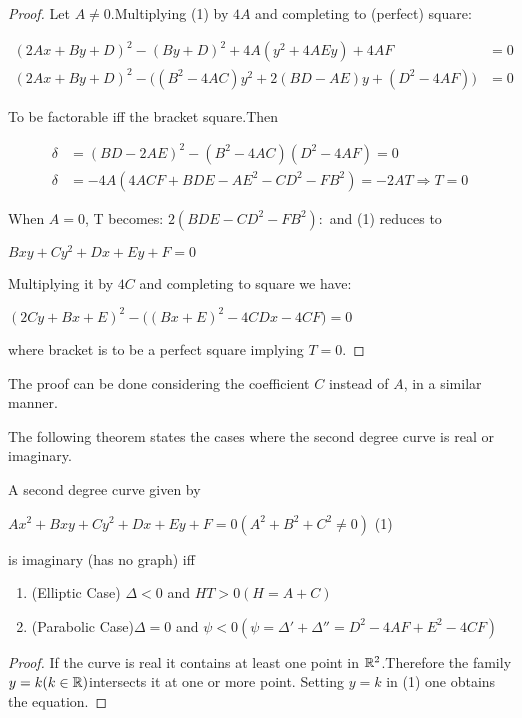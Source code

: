 \documentclass[11pt]{amsbook}
\begin{document}

	\begin{proof}
		Let $A\neq0$.Multiplying (1) by $4A$ and completing to (perfect) square:
		
		\begin{align*}
			(2Ax+By+D)^2-(By+D)^2+4A(y^2+4AEy)+4AF&=0\\
			(2Ax+By+D)^2-\Big((B^2-4AC)y^2+2(BD-AE)y+(D^2-4AF)\Big)&=0
		\end{align*}

		To be factorable iff the bracket square.Then

		\begin{align*}
		\delta &= (BD-2AE)^2-(B^2-4AC)(D^2-4AF)=0\\
		\delta &=-4A(4ACF+BDE-AE^2-CD^2-FB^2)=-2AT\Rightarrow T=0
		\end{align*}
		
		When $A=0$, T becomes: $2(BDE-CD^2-FB^2):$ and (1) reduces to

		\begin{center}
		$Bxy+Cy^2+Dx+Ey+F=0$
		\end{center}
		
		Multiplying it by $4C$ and completing to square we have:
		
		\begin{center}
		$(2Cy+Bx+E)^2-\Big((Bx+E)^2-4CDx-4CF\Big)=0$
		\end{center}
		
		where bracket is to be a perfect square implying $T=0$.
	
	\end{proof}

	The proof can be done considering the coefficient $C$ instead of $A$, in a similar manner.
	
	\par The following theorem states the cases where the second degree curve is real or imaginary.

	\begin{thm}
 	
 		A second degree curve given by 
		\begin{center}
		$Ax^2+Bxy+Cy^2+Dx+Ey+F=0 (A^2+B^2+C^2\neq 0)$ (1)
		\end{center}
	is imaginary (has no graph) iff
		
		\begin{enumerate}
    			\item(Elliptic Case) $\Delta<0$ and $HT>0 (H=A+C)$
    			\item (Parabolic Case)$\Delta=0$ and $\psi<0(\psi=\Delta'+\Delta''=D^2-4AF+E^2-4CF)$
		\end{enumerate}
	
	\end{thm}

	\begin{proof}
			If the curve is real it contains at least one point in $\mathbb{R}^2$.Therefore the family $y=k (k\in \mathbb{R}) $intersects it at one or more 						point. Setting $y=k$ in (1) one obtains the equation.	
	\end{proof}
\end{document}
